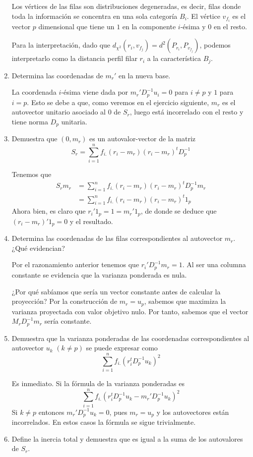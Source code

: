 \documentclass[twoside]{article}
\begin{document}
\begin{enumerate}
Los vértices de las filas son distribuciones degeneradas, es decir, filas donde toda la información se concentra en una sola categoría $B_i$. El vértice $v_{f_i}$ es el vector $p$ dimensional que tiene un $1$ en la componente $i$-ésima y $0$ en el resto.

Para la interpretación, dado que $d_{\chi^2}(r_i,v_{f_j})= d^2(P_{r_i},P_{v_{f_j}})$, podemos interpretarlo como la distancia perfil filar $r_i$ a la característica $B_j$.

\item Determina las coordenadas de $m_r'$ en la nueva base. 

La coordenada $i$-ésima viene dada por $m_r' D_p^{-1} u_i=0$ para $i\neq p$ y $1$ para $i=p$. Esto se debe a que, como veremos en el ejercicio siguiente, $m_r$ es el autovector unitario asociado al $0$ de $S_r$, luego está incorrelado con el resto y tiene norma $D_p$ unitaria.
\item Demuestra que $(0, m_r)$ es un autovalor-vector de la matriz
\[ S_r = \sum_{i=1}^n f_{i.} (r_i - m_r) (r_i - m_r)^t D_p^{-1} \]

Tenemos que
\begin{align*}
S_rm_r &= \sum_{i=1}^n f_{i.} (r_i - m_r) (r_i - m_r)^t D_p^{-1} m_r\\
& = \sum_{i=1}^n f_{i.} (r_i - m_r) (r_i - m_r)^t 1_p
\end{align*}
Ahora bien, es claro que $r_i' 1_p = 1 = m_r' 1_p$, de donde se deduce que $(r_i-m_r)'1_p = 0$ y el resultado.

\item Determina las coordenadas de las filas correspondientes al autovector $m_r$. ¿Qué evidencian?

Por el razonamiento anterior tenemos que $r_i' D_p^{-1} m_r = 1$. Al ser una columna constante se evidencia que la varianza ponderada es nula.

¿Por qué sabíamos que sería un vector constante antes de calcular la proyección? Por la construcción de $m_r = u_p$, sabemos que maximiza la varianza proyectada con valor objetivo nulo. Por tanto, sabemos que el vector $M_rD_p^{-1} m_r$ sería constante.

\item Demuestra que la varianza ponderadas de las coordenadas correspondientes al autovector $u_k$ $(k\neq p)$ se puede expresar como
\[ \sum_{i=1}^n f_{i.} (r_i^t D_p^{-1} u_k)^2 \]

Es inmediato. Si la fórmula de la varianza ponderadas es
$$
\sum_{i=1}^n f_{i.} (r_i^t D_p^{-1} u_k-m_r'D_p^{-1}u_k)^2
$$
Si $k\neq p$ entonces $m_r'D_p^{-1}u_k=0$, pues $m_r = u_p$ y los autovectores están incorrelados. En estos casos la fórmula se sigue trivialmente.
\item Define la inercia total y demuestra que es igual a la suma de los autovalores de $S_r$.


\end{enumerate}
\end{document}
